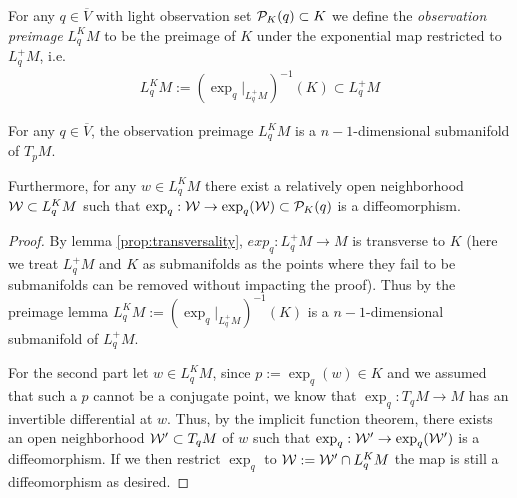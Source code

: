\begin{definition}
For any $q\in \overline{V}$ with light observation set $\mathcal{P}_K(q)\subset K$ we define the \emph{observation preimage} $L^K_qM$ to be the preimage of $K$ under the exponential map restricted to $L^+_qM$, i.e. 
\begin{align*}
    L^K_qM := (\exp_q\rvert_{L^+_qM})^{-1}(K) \subset L^+_qM
\end{align*}
\end{definition}
\begin{lemma}\label{lem:preimage}
For any $q\in \overline{V}$, the observation preimage $L^K_qM$ is a $n-1$-dimensional submanifold of $T_pM$. 

Furthermore, for any $w\in L^K_qM$ there exist a relatively open neighborhood $\mathcal{W}\subset L^K_qM$ such that $\exp_q:\mathcal{W}\to \exp_q(\mathcal{W})\subset \mathcal{P}_K(q)$ is a diffeomorphism.
\end{lemma}
\begin{proof}
    By lemma \ref{prop:transversality}, $exp_q:L^+_qM\to M$ is transverse to $K$ (here we treat $L^+_qM$ and $K$ as submanifolds as the points where they fail to be submanifolds can be removed without impacting the proof). Thus by the preimage lemma $ L^K_qM := (\exp_q\rvert_{L^+_qM})^{-1}(K)$ is a $n-1$-dimensional submanifold of $L^+_qM$.

    For the second part let $w\in L^K_qM$, since $p:=\exp_q(w)\in K$ and we assumed that such a $p$ cannot be a conjugate point, we know that $\exp_q:T_qM\to M$ has an invertible differential at $w$. Thus, by the implicit function theorem, there exists an open neighborhood $\mathcal{W}'\subset T_qM$ of $w$ such that $\exp_q:\mathcal{W}'\to \exp_q(\mathcal{W}')$ is a diffeomorphism. If we then restrict $\exp_q$ to $\mathcal{W}:=\mathcal{W}' \cap L^K_qM$ the map is still a diffeomorphism as desired.
\end{proof}

